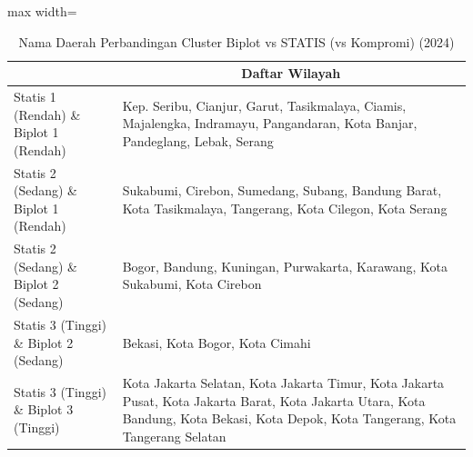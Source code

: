 \begin{table}[H]
\centering
\caption{Nama Daerah Perbandingan Cluster Biplot vs STATIS (vs Kompromi) (2024)} \label{tab:app1biplot_statis_name_2024}
\begin{adjustbox}{max width=\textwidth}
\begin{tabular}{|>{\centering\arraybackslash}p{4cm}|p{10cm}|}
\hline
\multicolumn{1}{|c|}{\textbf{Kategori}} & \multicolumn{1}{c|}{\textbf{Daftar Wilayah}} \\
\hline
Statis 1 (Rendah) \& Biplot 1 (Rendah) & Kep. Seribu, Cianjur, Garut, Tasikmalaya, Ciamis, Majalengka, Indramayu, Pangandaran, Kota Banjar, Pandeglang, Lebak, Serang \\
\hline
Statis 2 (Sedang) \& Biplot 1 (Rendah) & Sukabumi, Cirebon, Sumedang, Subang, Bandung Barat, Kota Tasikmalaya, Tangerang, Kota Cilegon, Kota Serang \\
\hline
Statis 2 (Sedang) \& Biplot 2 (Sedang) & Bogor, Bandung, Kuningan, Purwakarta, Karawang, Kota Sukabumi, Kota Cirebon \\
\hline
Statis 3 (Tinggi) \& Biplot 2 (Sedang) & Bekasi, Kota Bogor, Kota Cimahi \\
\hline
Statis 3 (Tinggi) \& Biplot 3 (Tinggi) & Kota Jakarta Selatan, Kota Jakarta Timur, Kota Jakarta Pusat, Kota Jakarta Barat, Kota Jakarta Utara, Kota Bandung, Kota Bekasi, Kota Depok, Kota Tangerang, Kota Tangerang Selatan \\
\hline
\end{tabular}
\end{adjustbox}
\end{table}